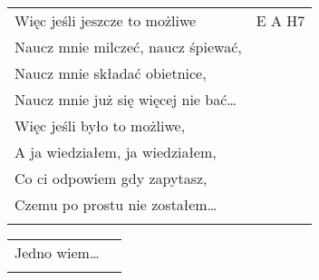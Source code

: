 \documentclass[a5paper]{article}
\begin{document}
\noindent
\begin{tabular}{@{}p{6.50cm}p{3cm}@{}}
Więc jeśli jeszcze to możliwe & E A H7\\
Naucz mnie milczeć, naucz śpiewać, \\
Naucz mnie składać obietnice, \\
Naucz mnie już się więcej nie bać… \\
Więc jeśli było to możliwe, \\
A ja wiedziałem, ja wiedziałem, \\
Co ci odpowiem gdy zapytasz, \\
Czemu po prostu nie zostałem… \\ \\
\end{tabular}

\noindent
\begin{tabular}{@{}p{5.50cm}p{3cm}@{}} 
Jedno wiem… \\ \\
\end{tabular}
\end{document}

